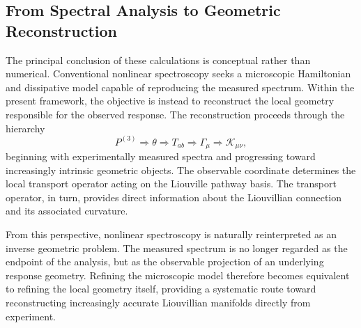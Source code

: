 \subsection{From Spectral Analysis to Geometric Reconstruction}
The principal conclusion of these calculations is conceptual
rather than numerical. Conventional nonlinear spectroscopy seeks
a microscopic Hamiltonian and dissipative model capable of
reproducing the measured spectrum. Within the present framework,
the objective is instead to reconstruct the local geometry
responsible for the observed response.
The reconstruction proceeds through the hierarchy
\[
P^{(3)}
\Longrightarrow
\theta
\Longrightarrow
T_{ab}
\Longrightarrow
\Gamma_\mu
\Longrightarrow
\mathcal{K}_{\mu\nu},
\]
beginning with experimentally measured spectra and progressing
toward increasingly intrinsic geometric objects. The observable
coordinate determines the local transport operator acting on the
Liouville pathway basis. The transport operator, in turn,
provides direct information about the Liouvillian connection and
its associated curvature.

From this perspective, nonlinear spectroscopy is naturally
reinterpreted as an inverse geometric problem. The measured
spectrum is no longer regarded as the endpoint of the analysis,
but as the observable projection of an underlying response
geometry. Refining the microscopic model therefore becomes
equivalent to refining the local geometry itself, providing a
systematic route toward reconstructing increasingly accurate
Liouvillian manifolds directly from experiment.


